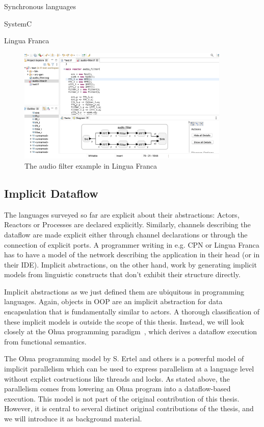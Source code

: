 Synchronous languages

SystemC

Lingua Franca
\begin{figure}[t]
	\centering
	\includegraphics[width=0.9\textwidth]{figures/audio_filter_lf_screenshot.png}
	\caption{The audio filter example in Lingua Franca}
	\label{fig:audio_filter_lf}
\end{figure}


\subsection{Implicit Dataflow}

The languages surveyed so far are explicit about their abstractions: Actors, Reactors or Processes are declared explicitly.
Similarly, channels describing the dataflow are made explicit either through channel declarations or through the connection of explicit ports.
A programmer writing in e.g. \ac{CPN} or Lingua Franca has to have a model of the network describing the application in their head (or in their \acs{IDE}).
Implicit abstractions, on the other hand, work by generating implicit models from linguistic constructs that don't exhibit their structure directly.

Implicit abstractions as we just defined them are ubiquitous in programming languages.
Again, objects in \ac{OOP} are an implicit abstraction for data encapsulation that is fundamentally similar to actors.
A thorough classification  of these implicit models is outside the scope of this thesis.
Instead, we will look closely at the Ohua programming paradigm~\cite{ertel_phdthesis}, which derives a dataflow execution from functional semantics.

The Ohua programming model by S. Ertel and others is a powerful model of implicit parallelism which can be used to express parallelism at a language level without explict costructions like threads and locks. 
As stated above, the parallelism comes from lowering an Ohua program into a dataflow-based execution.
This model is not part of the original contribution of this thesis.
However, it is central to several distinct original contributions of the thesis, and we will introduce it as background material.

